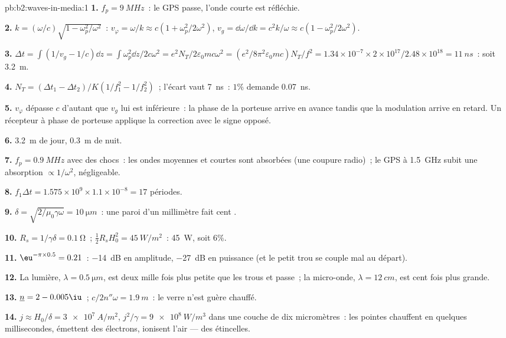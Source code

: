 \begin{solution}{pb:b2:waves-in-media:1}
\textbf{1.} $f_p = \qty{9}{MHz}$~: le GPS passe, l'onde courte est réfléchie.

\textbf{2.} $k = (\omega/c)\sqrt{1 - \omega_p^2/\omega^2}$~: $v_\varphi = \omega/k \approx c(1 + \omega_p^2/
2\omega^2)$, $v_g = \dd\omega/\dd k = c^2k/\omega \approx c(1 - \omega_p^2/2\omega^2)$.

\textbf{3.} $\Delta t = \int(1/v_g - 1/c)\dd z = \int\omega_p^2\dd z/2c\omega^2 = e^2N_T/2\varepsilon_0
mc\omega^2 = (e^2/8\pi^2\varepsilon_0mc)N_T/f^2 = 1.34 \times 10^{-7} \times 2 \times 10^{17}/2.48 \times
10^{18} = \qty{11}{ns}$~: soit \qty{3.2}{m}.

\textbf{4.} $N_T = (\Delta t_1 - \Delta t_2)/K(1/f_1^2 - 1/f_2^2)$~; l'écart vaut
\qty{7}{ns}~: $1\%$ demande \qty{0.07}{ns}.

\textbf{5.} $v_\varphi$ dépasse $c$ d'autant que $v_g$ lui est inférieure~: la
phase de la porteuse arrive en avance tandis que la modulation arrive en retard. Un
récepteur à phase de porteuse applique la correction avec le signe opposé.

\textbf{6.} \qty{3.2}{m} de jour, \qty{0.3}{m} de nuit.

\textbf{7.} $f_p = \qty{0.9}{MHz}$ avec des chocs~: les ondes moyennes et courtes sont
absorbées (une coupure radio)~; le GPS à \qty{1.5}{GHz} subit une absorption
$\propto 1/\omega^2$, négligeable.

\textbf{8.} $f_1\Delta t = 1.575 \times 10^9 \times 1.1 \times 10^{-8} = 17$ périodes.

\textbf{9.} $\delta = \sqrt{2/\mu_0\gamma\omega} = \qty{10}{\micro m}$~: une paroi d'un millimètre fait
cent .

\textbf{10.} $R_s = 1/\gamma\delta = \qty{0.1}{\ohm}$~; $\tfrac12R_sH_0^2 = \qty{45}{W/m^2}$~: \qty{45}{W},
soit $6\%$.

\textbf{11.} $\eu^{-\pi \times 0.5} = 0.21$~: \qty{-14}{dB} en amplitude, \qty{-27}{dB} en
puissance (et le petit trou se couple mal au départ).

\textbf{12.} La lumière, $\lambda = \qty{0.5}{\micro m}$, est deux mille fois plus petite
que les trous et passe~; la micro-onde, $\lambda = \qty{12}{cm}$, est
cent fois plus grande.

\textbf{13.} $\underline n = 2 - 0.005\iu$~; $c/2n''\omega = \qty{1.9}{m}$~: le verre n'est
guère chauffé.

\textbf{14.} $j \approx H_0/\delta = \qty{3e7}{A/m^2}$, $j^2/\gamma = \qty{9e8}{W/m^3}$ dans une
couche de dix micromètres~: les pointes chauffent en quelques millisecondes, émettent des électrons,
ionisent l'air --- des étincelles.


\end{solution}
